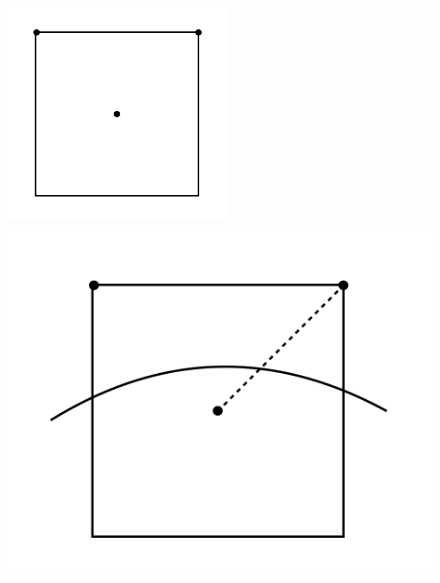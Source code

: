 \begin{figure}[H]\label{smoothRepresentation}
    \centering
    \begin{minipage}[b]{0.47\textwidth}
        \centering
        \includegraphics[width=5.8cm]{Images/chap3/1.png}
        \subcaption{}
    \end{minipage}
    \hfill
    \begin{minipage}[b]{0.47\textwidth}
        \centering
        \includegraphics[width=\textwidth]{Images/chap3/2.png}
        \subcaption{}
    \end{minipage}
    
    \vspace{1em} %


\end{figure}
